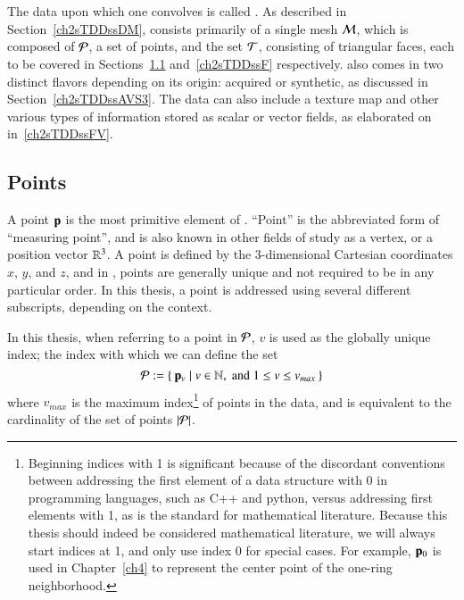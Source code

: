 \section{\tdd}
\label{ch2sTDD}
The data upon which one convolves  is called \tdd{}. As described in Section~\ref{ch2sTDDssDM}, \tdd{} consists primarily of a single mesh $\mathcal{M}$, which is composed of $\mathcal{P}$, a set of points, and the set $\mathcal{T}$, consisting of triangular faces, each to be covered in Sections~\ref{ch2sTDDssP} and~\ref{ch2sTDDssF} respectively. \tdd{} also comes in two distinct flavors depending on its origin: acquired or synthetic, as discussed in Section~\ref{ch2sTDDssAVS3}. The data can also include a texture map and other various types of information stored as scalar or vector fields, as elaborated on in~\ref{ch2sTDDssFV}.

%
%
%
%
\subsection{Points}
\label{ch2sTDDssP}
A point $\mathbf{p}$ is the most primitive element of \tdd{}. ``Point'' is the abbreviated form of ``measuring point'', and is also known in other fields of study as a vertex, or a position vector $\mathbb{R}^{3}$. A point is defined by the 3-dimensional Cartesian coordinates $x$, $y$, and $z$, and in \tdd{}, points are generally unique and not required to be in any particular order. In this thesis, a point is addressed using several different subscripts, depending on the context.

In this thesis, when referring to a point in $\mathcal{P}$, $v$ is used as the globally unique index; the index with which we can define the set
%
\begin{equation}
	\mathcal{P} := \left \{\:\mathbf{p}_v \mid v \in \mathbb{N}, \;\text{and}\; 1\leq v \leq v_{max}\:\right \}
	\label{eq:defineSetOfPoints}
\end{equation}
%
where $v_{max}$ is the maximum index\footnote{\label{indicesFootnote}Beginning indices with 1 is significant because of the discordant conventions between addressing the first element of a data structure with 0 in programming languages, such as C++ and python, versus addressing first elements with 1, as is the standard for mathematical literature. Because this thesis should indeed be considered mathematical literature, we will always start indices at 1, and only use index 0 for special cases. For example, $\mathbf{p}_0$ is used in Chapter~\ref{ch4} to represent the center point of the one-ring neighborhood.} of points in the data, and is equivalent to the cardinality of the set of points $|\mathcal{P}|$.%
%
%


